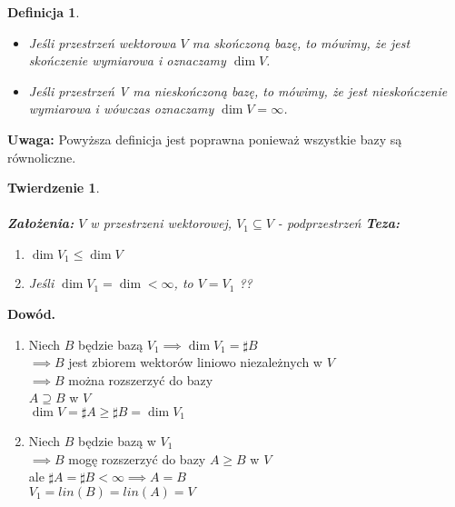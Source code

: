 \documentclass[a5paper,8pt]{article}
\newtheorem{definition}{Definicja}[section]
\newtheorem{theorem}{Twierdzenie}[section]
\begin{document}
    \begin{definition} \hfill
        \begin{itemize}
            \item Jeśli przestrzeń wektorowa $ V $ ma skończoną bazę, to mówimy, że jest skończenie wymiarowa i oznaczamy $ \dim V $.
            \item Jeśli przestrzeń V ma nieskończoną bazę, to mówimy, że jest nieskończenie wymiarowa i wówczas oznaczamy $ \dim V = \infty $.
        \end{itemize}
    \end{definition}

    \large{\textbf{Uwaga:}}
    Powyższa definicja jest poprawna ponieważ wszystkie bazy są równoliczne.


    \begin{theorem} \hfill \\\\
        \textbf{Założenia: } $ V $ w przestrzeni wektorowej, $ V_1 \subseteq V $ - podprzestrzeń
        \textbf{Teza: }
        \begin{enumerate}
            \item $ \dim V_1 \leq \dim V $
            \item Jeśli $ \dim V_1 = \dim < \infty $, to $ V = V_1 $ ??
        \end{enumerate}
    \end{theorem}

    \large{\textbf{Dowód.}} \\
    \begin{enumerate}
        \item Niech $B$ będzie bazą $ V_1 \implies \dim V_1 = \sharp B $ \\
              $ \implies B $ jest zbiorem wektorów liniowo niezależnych w $ V $ \\
              $ \implies B $ można rozszerzyć do bazy \\
              $ A \supseteq B $ w $ V $ \\
              $ \dim V = \sharp A \geq \sharp B = \dim V_1 $
        \item Niech $B$ będzie bazą w $V_1$ \\
              $ \implies B $ mogę rozszerzyć do bazy $ A \geq B $ w $V$ \\
              ale  $ \sharp A = \sharp B < \infty \implies A = B $ \\

              $ V_1 = lin( B ) = lin( A ) = V  $
    \end{enumerate}
\end{document}
